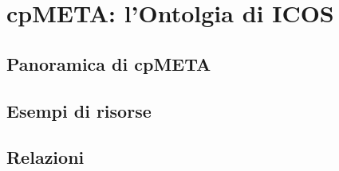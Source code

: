 \chapter{cpMETA: l'Ontolgia di ICOS}
\label{chap:cpMETA}

\section{Panoramica di cpMETA}
\label{section:panoramica}

\section{Esempi di risorse}
\label{section:esempidirisorse}

\section{Relazioni}
\label{section:relazioni}
